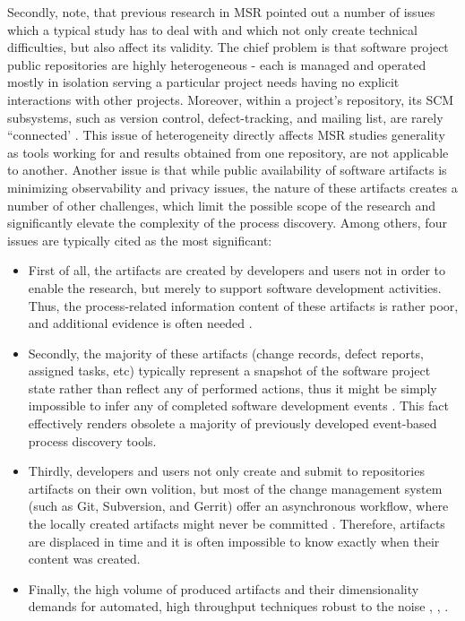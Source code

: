Secondly, note, that previous research in MSR pointed out a number of issues which a typical study has to deal with and which
not only create technical difficulties, but also affect its validity. 
The chief problem is that software project public repositories are highly heterogeneous - each is managed and operated 
mostly in isolation serving a particular project needs having no explicit interactions with other projects. 
Moreover, within a project's repository, its SCM subsystems, such as version control, defect-tracking, and mailing list, 
are rarely ``connected'  \cite{citeulike:13058334}. 
This issue of heterogeneity directly affects MSR studies generality as tools working for and results obtained from one repository,
are not applicable to another.
Another issue is that while public availability of software artifacts is minimizing observability and privacy issues, 
the nature of these artifacts creates a number of other challenges, which limit the possible scope of the research and 
significantly elevate the complexity of the process discovery. Among others, four issues are typically cited as the most significant:
\begin{itemize}
 \item First of all, the artifacts are created by developers and users not in order to enable the research,
but merely to support software development activities. Thus, the process-related information content of these
artifacts is rather poor, and additional evidence is often needed \cite{citeulike:342840} \cite{citeulike:7954249} 
\cite{citeulike:7260421}.
 \item Secondly, the majority of these artifacts (change records, defect reports, assigned tasks, etc) 
typically represent a snapshot of the software project state rather than reflect any of performed actions, 
thus it might be simply impossible to infer any of completed software development events \cite{citeulike:1296888}.
This fact effectively renders obsolete a majority of previously developed event-based process discovery tools.
 \item Thirdly, developers and users not only create and submit to repositories artifacts on their own volition,
but most of the change management system (such as Git, Subversion, and Gerrit) offer an asynchronous workflow, 
where the locally created artifacts might never be committed \cite{citeulike:2280690} \cite{citeulike:9037939}. 
Therefore, artifacts are displaced in time and it is often impossible to know exactly when their content was created.
 \item Finally, the high volume of produced artifacts and their dimensionality demands for automated, high throughput 
techniques robust to the noise \cite{citeulike:12550438}, \cite{citeulike:7853299}, \cite{citeulike:4534888}.
\end{itemize}

